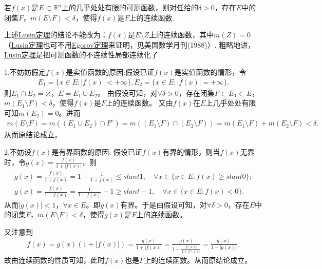 \documentclass[../../main.tex]{subfiles}
\begin{document}
\begin{theorem}[Lusin(卢津)定理]\label{theorem:Lusin(卢津)定理}
若\(f(x)\)是\(E \subset \mathbb{R}^{n}\)上的几乎处处有限的可测函数，则对任给的\(\delta > 0\)，存在\(E\)中的闭集\(F\)，\(m(E \setminus F) < \delta\)，使得\(f(x)\)是\(F\)上的连续函数.
\end{theorem}
\begin{remark}
上述\hyperref[theorem:Lusin(卢津)定理]{Lusin定理}的结论不能改为：\(f(x)\)是\(E \setminus Z\)上的连续函数，其中\(m(Z) = 0\)（\hyperref[theorem:Lusin(卢津)定理]{Lusin定理}也可不用\hyperref[theorem:Egorov定理]{Egorov定理}来证明，见美国数学月刊(1988)）. 粗略地讲，\hyperref[theorem:Lusin(卢津)定理]{Lusin定理}是把可测函数的不连续性局部连续化了. 
\end{remark}
\begin{remark}
1.\hypertarget{不妨假定f是实值函数的原因}{不妨妨假定}\(f(x)\)是实值函数的原因:假设已证\(f(x)\)是实值函数的情形，令
\begin{align*}
E_1 = \{x \in E : |f(x)| < +\infty\},E_2 = \{x \in E : |f(x)| = +\infty\}.
\end{align*}
则\(E_1 \cap E_2 = \varnothing\)，\(E = E_1 \cup E_2\)。
由假设可知，对\(\forall \delta > 0\)，存在闭集\(F \subset E_1 \subset E\)，\(m(E_1 \setminus F) < \delta\)，使得\(f(x)\)是\(F\)上的连续函数。
又由\(f(x)\)在\(E\)上几乎处处有限可知\(m(E_2) = 0\)。进而
\begin{align*}
m(E \setminus F) = m((E_1 \cup E_2) \cap F^c) 
= m((E_1 \setminus F) \cap (E_2 \setminus F)) 
= m(E_1 \setminus F) + m(E_2 \setminus F) 
< \delta.
\end{align*}
从而原结论成立。

2.\hypertarget{不妨设f有界的原因}{不妨设$f(x)$是有界函数的原因:} 假设已证\(f(x)\)有界的情形，则当\(f(x)\)无界时，令\(g(x) = \frac{f(x)}{1 + |f(x)|}\)，则
\begin{align*}
g(x) = \frac{f(x)}{1 + f(x)} = 1 - \frac{1}{1 + f(x)} \leqslant slant 1, \quad \forall x \in \{x \in E : f(x) \geqslant slant 0\}; \\
g(x) = \frac{f(x)}{1 - f(x)} = \frac{1}{1 - f(x)} - 1 \geqslant slant -1, \quad \forall x \in \{x \in E : f(x) < 0\}.
\end{align*}
从而\(|g(x)| < 1\)，\(\forall x \in E\)。即\(g(x)\)有界。于是由假设可知，对\(\forall \delta > 0\)，存在\(E\)中的闭集\(F\)，\(m(E \setminus F) < \delta\)，使得\(g(x)\)是\(F\)上的连续函数。

又注意到
\begin{align*}
f(x) = g(x)(1 + |f(x)|) = \frac{g(x)}{1 + |f(x)|} = \frac{g(x)}{1 - \frac{|f(x)|}{1 + |f(x)|}} = \frac{g(x)}{1 - |g(x)|},
\end{align*}
故由连续函数的性质可知，此时\(f(x)\)也是\(F\)上的连续函数。从而原结论成立。
\end{remark}
\end{document}
